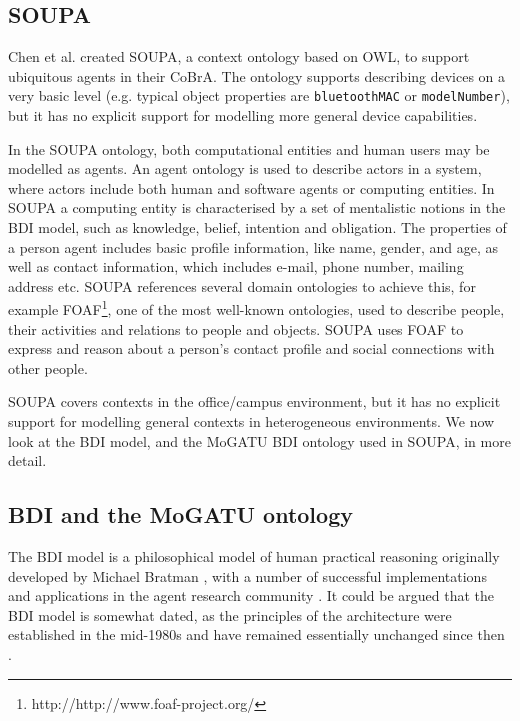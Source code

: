 
\subsection{SOUPA}

Chen et al. \cite{Chen2004} created \ac{SOUPA}, a context ontology based on \ac{OWL}, to support ubiquitous agents in their \ac{CoBrA}. The ontology supports describing devices on a very basic level (e.g. typical object properties are \texttt{bluetoothMAC} or \texttt{modelNumber}), but it has no explicit support for modelling more general device capabilities.

In the \ac{SOUPA} ontology, both computational entities and human users may be modelled as agents. An agent ontology is used to describe actors in a system, where actors include both human and software agents or computing entities. In \ac{SOUPA} a computing entity is characterised by a set of mentalistic notions in the \ac{BDI} model, such as knowledge, belief, intention and obligation. The properties of a person agent includes basic profile information, like name, gender, and age, as well as contact information, which includes e-mail, phone number, mailing address etc. \ac{SOUPA} references several domain ontologies to achieve this, for example \ac{FOAF}\footnote{http://http://www.foaf-project.org/}, one of the most well-known ontologies, used to describe people, their activities and relations to people and objects. \ac{SOUPA} uses \ac{FOAF} to express and reason about a person's contact profile and social connections with other people.

\ac{SOUPA} covers contexts in the office/campus environment, but it has no explicit support for modelling general contexts in heterogeneous environments. We now look at the \ac{BDI} model, and the MoGATU \ac{BDI} ontology used in \ac{SOUPA}, in more detail.
\subsection{BDI and the MoGATU ontology}

The \ac{BDI} model is a philosophical model of human practical reasoning originally developed by Michael Bratman \cite{Bratman1987}, with a number of successful implementations and applications in the agent research community \cite{Bratman1988, Georgeff1996}. It could be argued that the \ac{BDI} model is somewhat dated, as the principles of the architecture were established in the mid-1980s and have remained essentially unchanged since then \cite{Georgeff1999}. 

